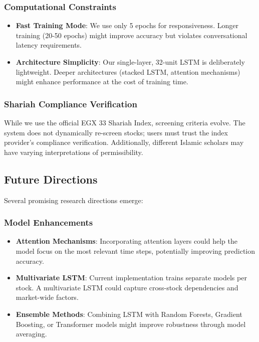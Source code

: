 \documentclass[conference]{IEEEtran}
\begin{document}
\subsubsection{Computational Constraints}
\begin{itemize}
\item \textbf{Fast Training Mode}: We use only 5 epochs for responsiveness. Longer training (20-50 epochs) might improve accuracy but violates conversational latency requirements.
\item \textbf{Architecture Simplicity}: Our single-layer, 32-unit LSTM is deliberately lightweight. Deeper architectures (stacked LSTM, attention mechanisms) might enhance performance at the cost of training time.
\end{itemize}

\subsubsection{Shariah Compliance Verification}
While we use the official EGX 33 Shariah Index, screening criteria evolve. The system does not dynamically re-screen stocks; users must trust the index provider's compliance verification. Additionally, different Islamic scholars may have varying interpretations of permissibility.

\subsection{Future Directions}

Several promising research directions emerge:

\subsubsection{Model Enhancements}
\begin{itemize}
\item \textbf{Attention Mechanisms}: Incorporating attention layers could help the model focus on the most relevant time steps, potentially improving prediction accuracy.
\item \textbf{Multivariate LSTM}: Current implementation trains separate models per stock. A multivariate LSTM could capture cross-stock dependencies and market-wide factors.
\item \textbf{Ensemble Methods}: Combining LSTM with Random Forests, Gradient Boosting, or Transformer models might improve robustness through model averaging.
\end{itemize}
\end{document}
